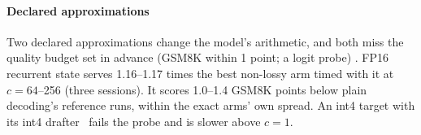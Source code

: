 \paragraph{Declared approximations} Two declared approximations change the model's arithmetic, and both miss the quality budget set in advance (GSM8K within 1 point; a logit probe) . FP16 recurrent state serves 1.16--1.17 times the best non-lossy arm timed with it at $c=64$--256 (three sessions). It scores 1.0--1.4 GSM8K points below plain decoding's reference runs, within the exact arms' own spread. An int4 target with its int4 drafter~\cite{nota2026} fails the probe and is slower above $c=1$.
